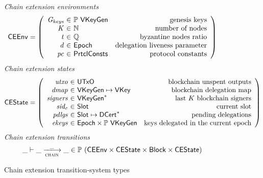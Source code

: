 \begin{figure}
  \emph{Chain extension environments}
  \begin{equation*}
    \CEEnv =
    \left(
      \begin{array}{r@{~\in~}lr}
        \var{\Gkeys} & \powerset{\VKeyGen} & \text{genesis keys}\\
        \var{K} & \mathbb{N} & \text{number of nodes}\\
        \var{t} & \mathbb{Q} & \text{byzantine nodes ratio}\\
        \var{d} & \Epoch & \text{delegation liveness parameter}\\
        \var{pc} & \PrtclConsts & \text{protocol constants}\\
      \end{array}
    \right)
  \end{equation*}
  \emph{Chain extension states}
  \begin{equation*}
    \CEState =
    \left(
      \begin{array}{r@{~\in~}lr}
        \var{utxo} & \UTxO & \text{blockchain unspent outputs}\\
        \var{dmap} & \VKeyGen \mapsto \VKey & \text{blockchain delegation map}\\
        \var{signers} & \seqof{\VKeyGen} & \text{last $K$ blockchain signers}\\
        \var{sid_c} & \Slot & \text{current slot}\\
        \var{pdlgs} & \Slot \mapsto \seqof{\DCert} & \text{pending delegations}\\
        \var{ekeys} & \Epoch \times \powerset{\VKeyGen} & \text{keys delegated in the current epoch}
      \end{array}
    \right)
  \end{equation*}
  \emph{Chain extension transitions}
  \begin{equation*}
    \_ \vdash \_ \trans{chain}{\_} \_ \in
      \powerset (\CEEnv \times \CEState \times \Block \times \CEState)
  \end{equation*}
  \caption{Chain extension transition-system types}
  \label{fig:ts-types:chain-extension}
\end{figure}

